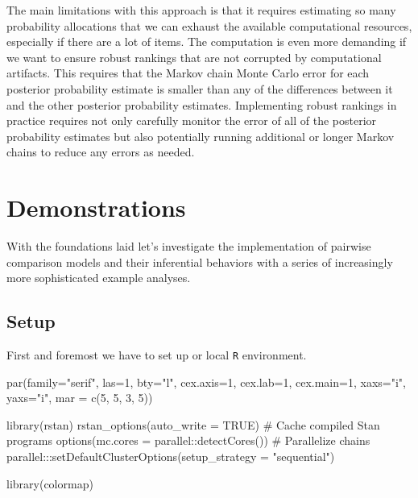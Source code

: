 \documentclass[
  letterpaper,
  DIV=11,
  numbers=noendperiod]{scrartcl}
\newenvironment{Shaded}{\begin{snugshade}}{\end{snugshade}}
\newcommand{\AttributeTok}[1]{\textcolor[rgb]{0.40,0.45,0.13}{#1}}
\newcommand{\CommentTok}[1]{\textcolor[rgb]{0.37,0.37,0.37}{#1}}
\newcommand{\ConstantTok}[1]{\textcolor[rgb]{0.56,0.35,0.01}{#1}}
\newcommand{\DecValTok}[1]{\textcolor[rgb]{0.68,0.00,0.00}{#1}}
\newcommand{\FunctionTok}[1]{\textcolor[rgb]{0.28,0.35,0.67}{#1}}
\newcommand{\NormalTok}[1]{\textcolor[rgb]{0.00,0.23,0.31}{#1}}
\newcommand{\SpecialCharTok}[1]{\textcolor[rgb]{0.37,0.37,0.37}{#1}}
\newcommand{\StringTok}[1]{\textcolor[rgb]{0.13,0.47,0.30}{#1}}
\begin{document}
The main limitations with this approach is that it requires estimating
so many probability allocations that we can exhaust the available
computational resources, especially if there are a lot of items. The
computation is even more demanding if we want to ensure robust rankings
that are not corrupted by computational artifacts. This requires that
the Markov chain Monte Carlo error for each posterior probability
estimate is smaller than any of the differences between it and the other
posterior probability estimates. Implementing robust rankings in
practice requires not only carefully monitor the error of all of the
posterior probability estimates but also potentially running additional
or longer Markov chains to reduce any errors as needed.

\section{Demonstrations}\label{demonstrations}

With the foundations laid let's investigate the implementation of
pairwise comparison models and their inferential behaviors with a series
of increasingly more sophisticated example analyses.

\subsection{Setup}\label{setup}

First and foremost we have to set up or local \texttt{R} environment.

\begin{Shaded}
\begin{Highlighting}[]
\FunctionTok{par}\NormalTok{(}\AttributeTok{family=}\StringTok{"serif"}\NormalTok{, }\AttributeTok{las=}\DecValTok{1}\NormalTok{, }\AttributeTok{bty=}\StringTok{"l"}\NormalTok{,}
    \AttributeTok{cex.axis=}\DecValTok{1}\NormalTok{, }\AttributeTok{cex.lab=}\DecValTok{1}\NormalTok{, }\AttributeTok{cex.main=}\DecValTok{1}\NormalTok{,}
    \AttributeTok{xaxs=}\StringTok{"i"}\NormalTok{, }\AttributeTok{yaxs=}\StringTok{"i"}\NormalTok{, }\AttributeTok{mar =} \FunctionTok{c}\NormalTok{(}\DecValTok{5}\NormalTok{, }\DecValTok{5}\NormalTok{, }\DecValTok{3}\NormalTok{, }\DecValTok{5}\NormalTok{))}
\end{Highlighting}
\end{Shaded}

\begin{Shaded}
\begin{Highlighting}[]
\FunctionTok{library}\NormalTok{(rstan)}
\FunctionTok{rstan\_options}\NormalTok{(}\AttributeTok{auto\_write =} \ConstantTok{TRUE}\NormalTok{)            }\CommentTok{\# Cache compiled Stan programs}
\FunctionTok{options}\NormalTok{(}\AttributeTok{mc.cores =}\NormalTok{ parallel}\SpecialCharTok{::}\FunctionTok{detectCores}\NormalTok{()) }\CommentTok{\# Parallelize chains}
\NormalTok{parallel}\SpecialCharTok{:::}\FunctionTok{setDefaultClusterOptions}\NormalTok{(}\AttributeTok{setup\_strategy =} \StringTok{"sequential"}\NormalTok{)}

\FunctionTok{library}\NormalTok{(colormap)}
\end{Highlighting}
\end{Shaded}
\end{document}
